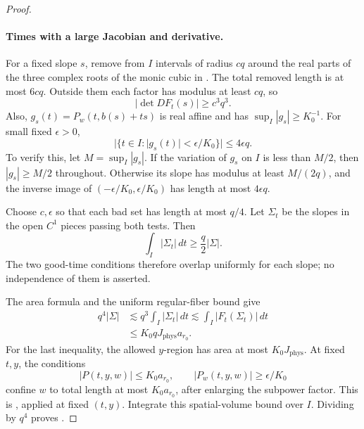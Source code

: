 \begin{proof}
\paragraph{Times with a large Jacobian and derivative.}
For a fixed slope \(s\), remove from \(I\) intervals
of radius \(cq\) around the real parts of the three
complex roots of the monic cubic in
.
The total removed length is at most \(6cq\).
Outside them each factor has modulus at least \(cq\),
so
\[
 |\det DF_t(s)|\ge c^3q^3.
\]
Also,
\(g_s(t)=P_w(t,b(s)+ts)\) is real affine and has
\(\sup_I|g_s|\ge K_0^{-1}\).
For small fixed \(\epsilon>0\),
\begin{equation}
 |\{t\in I:|g_s(t)|<\epsilon/K_0\}|
 \le4\epsilon q.
 \label{a01:affine-good-time}
\end{equation}
To verify this, let \(M=\sup_I|g_s|\).
If the variation of \(g_s\) on \(I\) is less than
\(M/2\), then \(|g_s|\ge M/2\) throughout.
Otherwise its slope has modulus at least \(M/(2q)\),
and the inverse image of
\((-\epsilon/K_0,\epsilon/K_0)\) has length at most
\(4\epsilon q\).

Choose \(c,\epsilon\) so that each bad set has
length at most \(q/4\).
Let \(\Sigma_t\) be the slopes in the open
\(C^1\) pieces passing both tests.
Then
\begin{equation}
 \int_I|\Sigma_t|\,dt\ge\frac q2|\Sigma|.
 \label{a01:good-time-overlap}
\end{equation}
The two good-time conditions therefore overlap
uniformly for each slope; no independence of them
is asserted.

The area formula and the uniform regular-fiber bound
give
\begin{align}
 q^4|\Sigma|
 &\lesssim q^3\int_I|\Sigma_t|\,dt
 \lesssim \int_I|F_t(\Sigma_t)|\,dt\\
 &\le K_0qJ_{\mathrm{phys}}a_{r_0}.
 \label{a01:selector-volume}
\end{align}
For the last inequality, the allowed \(y\)-region
has area at most \(K_0J_{\mathrm{phys}}\).
At fixed \(t,y\), the conditions
\[
 |P(t,y,w)|\le K_0a_{r_0},\qquad
 |P_w(t,y,w)|\ge\epsilon/K_0
\]
confine \(w\) to total length at most
\(K_0a_{r_0}\), after enlarging the subpower factor.
This is , applied at fixed
\((t,y)\).
Integrate this spatial-volume bound over \(I\). Dividing
 by \(q^4\) proves
.


\end{proof}
